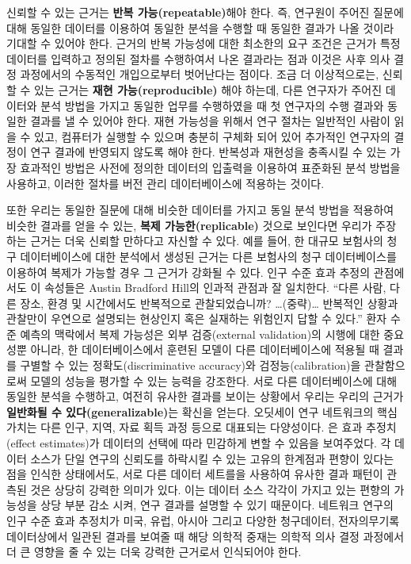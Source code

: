 \documentclass[11pt]{book}
\theoremstyle{definition}
\theoremstyle{definition}
\theoremstyle{definition}
\theoremstyle{remark}
\begin{document}
신뢰할 수 있는 근거는 \textbf{반복 가능(repeatable)}해야 한다. 즉,
연구원이 주어진 질문에 대해 동일한 데이터를 이용하여 동일한 분석을
수행할 때 동일한 결과가 나올 것이라 기대할 수 있어야 한다. 근거의 반복
가능성에 대한 최소한의 요구 조건은 근거가 특정 데이터를 입력하고 정의된
절차를 수행하여서 나온 결과라는 점과 이것은 사후 의사 결정 과정에서의
수동적인 개입으로부터 벗어난다는 점이다. 조금 더 이상적으로는, 신뢰할 수
있는 근거는 \textbf{재현 가능(reproducible)} 해야 하는데, 다른 연구자가
주어진 데이터와 분석 방법을 가지고 동일한 업무를 수행하였을 때 첫
연구자의 수행 결과와 동일한 결과를 낼 수 있어야 한다. 재현 가능성을
위해서 연구 절차는 일반적인 사람이 읽을 수 있고, 컴퓨터가 실행할 수
있으며 충분히 구체화 되어 있어 추가적인 연구자의 결정이 연구 결과에
반영되지 않도록 해야 한다. 반복성과 재현성을 충족시킬 수 있는 가장
효과적인 방법은 사전에 정의한 데이터의 입출력을 이용하여 표준화된 분석
방법을 사용하고, 이러한 절차를 버전 관리 데이터베이스에 적용하는 것이다.

또한 우리는 동일한 질문에 대해 비슷한 데이터를 가지고 동일 분석 방법을
적용하여 비슷한 결과를 얻을 수 있는, \textbf{복제 가능한(replicable)}
것으로 보인다면 우리가 주장하는 근거는 더욱 신뢰할 만하다고 자신할 수
있다. 예를 들어, 한 대규모 보험사의 청구 데이터베이스에 대한 분석에서
생성된 근거는 다른 보험사의 청구 데이터베이스를 이용하여 복제가 가능할
경우 그 근거가 강화될 수 있다. 인구 수준 효과 추정의 관점에서도 이
속성들은 Austin Bradford Hill의 인과적 관점과 잘 일치한다. ``다른 사람,
다른 장소, 환경 및 시간에서도 반복적으로 관찰되었습니까?
\ldots{}(중략)\ldots{} 반복적인 상황과 관찰만이 우연으로 설명되는
현상인지 혹은 실재하는 위험인지 답할 수 있다.'' \citep{hill_1965} 환자
수준 예측의 맥락에서 복제 가능성은 외부 검증(external validation)의
시행에 대한 중요성뿐 아니라, 한 데이터베이스에서 훈련된 모델이 다른
데이터베이스에 적용될 때 결과를 구별할 수 있는 정확도(discriminative
accuracy)와 검정능(calibration)을 관찰함으로써 모델의 성능을 평가할 수
있는 능력을 강조한다. 서로 다른 데이터베이스에 대해 동일한 분석을
수행하고, 여전히 유사한 결과를 보이는 상황에서 우리는 우리의 근거가
\textbf{일반화될 수 있다(generalizable)}는 확신을 얻는다. 오딧세이 연구
네트워크의 핵심 가치는 다른 인구, 지역, 자료 획득 과정 등으로 대표되는
다양성이다. \citet{madigan_2013} 은 효과 추정치(effect estimates)가
데이터의 선택에 따라 민감하게 변할 수 있음을 보여주었다. 각 데이터
소스가 단일 연구의 신뢰도를 하락시킬 수 있는 고유의 한계점과 편향이
있다는 점을 인식한 상태에서도, 서로 다른 데이터 세트를을 사용하여 유사한
결과 패턴이 관측된 것은 상당히 강력한 의미가 있다. 이는 데이터 소스
각각이 가지고 있는 편향의 가능성을 상당 부분 감소 시켜, 연구 결과를
설명할 수 있기 때문이다. 네트워크 연구의 인구 수준 효과 추정치가 미국,
유럽, 아시아 그리고 다양한 청구데이터, 전자의무기록 데이터상에서 일관된
결과를 보여줄 때 해당 의학적 중재는 의학적 의사 결정 과정에서 더 큰
영향을 줄 수 있는 더욱 강력한 근거로서 인식되어야 한다.
\end{document}
